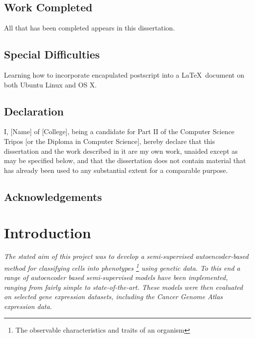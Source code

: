 \documentclass[12pt,a4paper,twoside,openright]{report}
\begin{document}
\section*{Work Completed}

All that has been completed appears in this dissertation.

\section*{Special Difficulties}

Learning how to incorporate encapulated postscript into a \LaTeX\
document on both Ubuntu Linux and OS X.
 
\newpage
\section*{Declaration}

I, [Name] of [College], being a candidate for Part II of the Computer
Science Tripos [or the Diploma in Computer Science], hereby declare
that this dissertation and the work described in it are my own work,
unaided except as may be specified below, and that the dissertation
does not contain material that has already been used to any substantial
extent for a comparable purpose.

\bigskip
{}

\medskip
{}

\tableofcontents

\listoffigures

\newpage
\section*{Acknowledgements}


\pagestyle{headings}

\chapter{Introduction}

\textit{The stated aim of this project was to develop a semi-supervised autoencoder-based method for classifying 
cells into phenotypes \footnote{The observable characteristics and traits of an organism} using genetic data. To this end a range 
of autoencoder based semi-supervised models have been implemented, 
ranging from fairly simple to state-of-the-art. These models were then evaluated on selected gene expression datasets, including 
the Cancer Genome Atlas expression data.}
\end{document}
